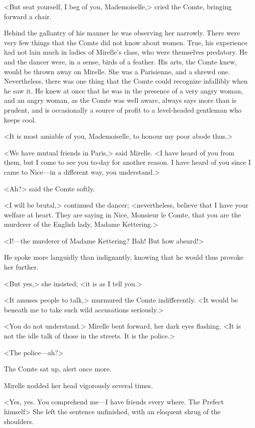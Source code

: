 <But seat yourself, I beg of you, Mademoiselle,> cried the Comte, bringing forward a chair.

Behind the gallantry of his manner he was observing her narrowly. There were very few things that the Comte did not know about women. True, his experience had not lain much in ladies of Mirelle's class, who were themselves predatory. He and the dancer were, in a sense, birds of a feather. His arts, the Comte knew, would be thrown away on Mirelle. She was a Parisienne, and a shrewd one. Nevertheless, there was one thing that the Comte could recognize infallibly when he saw it. He knew at once that he was in the presence of a very angry woman, and an angry woman, as the Comte was well aware, always says more than is prudent, and is occasionally a source of profit to a level-headed gentleman who keeps cool.

<It is most amiable of you, Mademoiselle, to honour my poor abode thus.>

<We have mutual friends in Paris,> said Mirelle. <I have heard of you from them, but I come to see you to-day for another reason. I have heard of you since I came to Nice—in a different way, you understand.>

<Ah?> said the Comte softly.

<I will be brutal,> continued the dancer; <nevertheless, believe that I have your welfare at heart. They are saying in Nice, Monsieur le Comte, that you are the murderer of the English lady, Madame Kettering.>

<I!—the murderer of Madame Kettering? Bah! But how absurd!>

He spoke more languidly than indignantly, knowing that he would thus provoke her further.

<But yes,> she insisted; <it is as I tell you.>

<It amuses people to talk,> murmured the Comte indifferently. <It would be beneath me to take such wild accusations seriously.>

<You do not understand.> Mirelle bent forward, her dark eyes flashing. <It is not the idle talk of those in the streets. It is the police.>

<The police—ah?>

The Comte sat up, alert once more.

Mirelle nodded her head vigorously several times.

<Yes, yes. You comprehend me—I have friends every where. The Prefect himself\longdash> She left the sentence unfinished, with an eloquent shrug of the shoulders.

